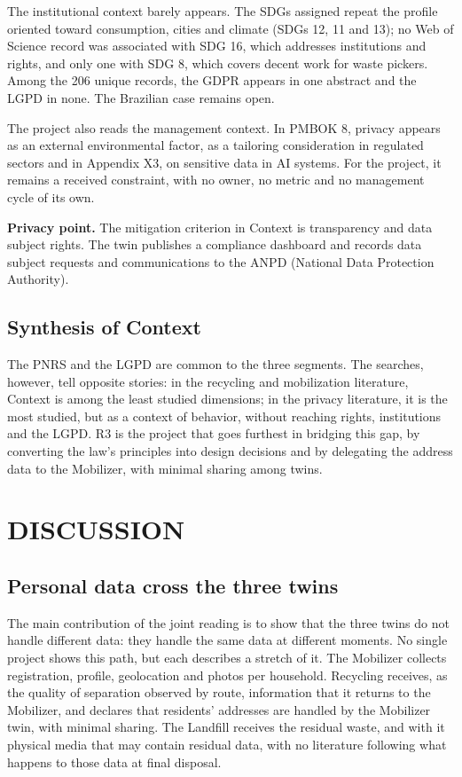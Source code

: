 \documentclass[12pt,a4paper,article,oneside,brazil,english]{abntex2}
\begin{document}
The institutional context barely appears. The SDGs assigned repeat the profile oriented toward consumption, cities and climate (SDGs 12, 11 and 13); no Web of Science record was associated with SDG 16, which addresses institutions and rights, and only one with SDG 8, which covers decent work for waste pickers. Among the 206 unique records, the GDPR appears in one abstract and the LGPD in none. The Brazilian case remains open.

The project also reads the management context. In PMBOK 8, privacy appears as an external environmental factor, as a tailoring consideration in regulated sectors and in Appendix X3, on sensitive data in AI systems. For the project, it remains a received constraint, with no owner, no metric and no management cycle of its own.

\textbf{Privacy point.} The mitigation criterion in Context is transparency and data subject rights. The twin publishes a compliance dashboard and records data subject requests and communications to the ANPD (National Data Protection Authority).

\subsection{Synthesis of Context}

The PNRS and the LGPD are common to the three segments. The searches, however, tell opposite stories: in the recycling and mobilization literature, Context is among the least studied dimensions; in the privacy literature, it is the most studied, but as a context of behavior, without reaching rights, institutions and the LGPD. R3 is the project that goes furthest in bridging this gap, by converting the law's principles into design decisions and by delegating the address data to the Mobilizer, with minimal sharing among twins.

\section{DISCUSSION}

\subsection{Personal data cross the three twins}

The main contribution of the joint reading is to show that the three twins do not handle different data: they handle the same data at different moments. No single project shows this path, but each describes a stretch of it. The Mobilizer collects registration, profile, geolocation and photos per household. Recycling receives, as the quality of separation observed by route, information that it returns to the Mobilizer, and declares that residents' addresses are handled by the Mobilizer twin, with minimal sharing. The Landfill receives the residual waste, and with it physical media that may contain residual data, with no literature following what happens to those data at final disposal.
\end{document}
